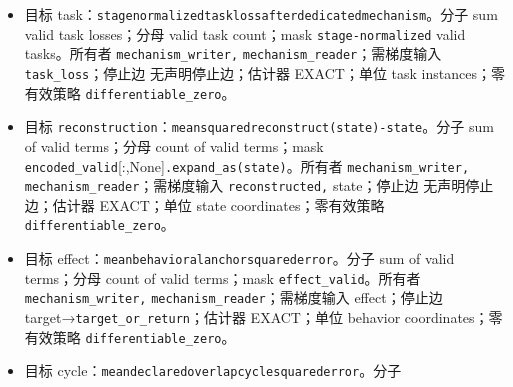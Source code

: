 \documentclass[
  10pt,
]{article}
\begin{document}
\begin{itemize}
\item
  目标
  task：{\small\nolinkurl{stage}\hspace{0.333em}\nolinkurl{normalized}\hspace{0.333em}\nolinkurl{task}\hspace{0.333em}\nolinkurl{loss}\hspace{0.333em}\nolinkurl{after}\hspace{0.333em}\nolinkurl{dedicated}\hspace{0.333em}\nolinkurl{mechanism}}。分子
  sum valid task losses；分母 valid task count；mask
  \nolinkurl{stage-normalized} valid tasks。所有者
  \nolinkurl{mechanism_writer,} \nolinkurl{mechanism_reader}；需梯度输入
  \nolinkurl{task_loss}；停止边 无声明停止边；估计器 EXACT；单位 task
  instances；零有效策略 \nolinkurl{differentiable_zero}。
\item
  目标
  \nolinkurl{reconstruction}：{\small\nolinkurl{mean}\hspace{0.333em}\nolinkurl{squared}\hspace{0.333em}\nolinkurl{reconstruct(state)-state}}。分子
  sum of valid terms；分母 count of valid terms；mask
  \nolinkurl{encoded_valid}{[}:,None{]}\nolinkurl{.expand_as(state)}。所有者
  \nolinkurl{mechanism_writer,} \nolinkurl{mechanism_reader}；需梯度输入
  \nolinkurl{reconstructed,} state；停止边 无声明停止边；估计器
  EXACT；单位 state coordinates；零有效策略
  \nolinkurl{differentiable_zero}。
\item
  目标
  effect：{\small\nolinkurl{mean}\hspace{0.333em}\nolinkurl{behavioral}\hspace{0.333em}\nolinkurl{anchor}\hspace{0.333em}\nolinkurl{squared}\hspace{0.333em}\nolinkurl{error}}。分子
  sum of valid terms；分母 count of valid terms；mask
  \nolinkurl{effect_valid}。所有者 \nolinkurl{mechanism_writer,}
  \nolinkurl{mechanism_reader}；需梯度输入 effect；停止边
  target→\nolinkurl{target_or_return}；估计器 EXACT；单位 behavior
  coordinates；零有效策略 \nolinkurl{differentiable_zero}。
\item
  目标
  cycle：{\small\nolinkurl{mean}\hspace{0.333em}\nolinkurl{declared}\hspace{0.333em}\nolinkurl{overlap}\hspace{0.333em}\nolinkurl{cycle}\hspace{0.333em}\nolinkurl{squared}\hspace{0.333em}\nolinkurl{error}}。分子

\end{itemize}
\end{document}
